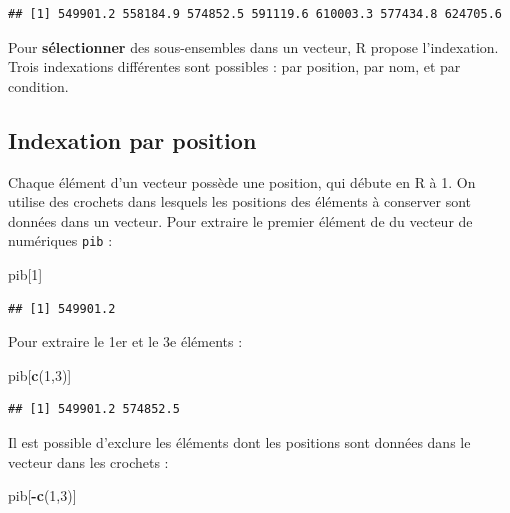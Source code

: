 \documentclass[
  11pt,
]{book}
\newenvironment{Shaded}{\begin{snugshade}}{\end{snugshade}}
\newcommand{\DecValTok}[1]{\textcolor[rgb]{0.00,0.00,0.81}{#1}}
\newcommand{\FunctionTok}[1]{\textcolor[rgb]{0.13,0.29,0.53}{\textbf{#1}}}
\newcommand{\NormalTok}[1]{#1}
\newcommand{\SpecialCharTok}[1]{\textcolor[rgb]{0.81,0.36,0.00}{\textbf{#1}}}
\numberwithin{equation}{section}
\numberwithin{countremarque}{section}
\begin{document}
\begin{lstlisting}
## [1] 549901.2 558184.9 574852.5 591119.6 610003.3 577434.8 624705.6
\end{lstlisting}

Pour \textbf{sélectionner} des sous-ensembles dans un vecteur, R propose l'indexation. Trois indexations différentes sont possibles : par position, par nom, et par condition.

\hypertarget{indexation-par-position}{%
\subsection{Indexation par position}\label{indexation-par-position}}

Chaque élément d'un vecteur possède une position, qui débute en R à 1. On utilise des crochets dans lesquels les positions des éléments à conserver sont données dans un vecteur. Pour extraire le premier élément de du vecteur de numériques \texttt{pib} :

\begin{Shaded}
\begin{Highlighting}[]
\NormalTok{pib[}\DecValTok{1}\NormalTok{]}
\end{Highlighting}
\end{Shaded}

\begin{lstlisting}
## [1] 549901.2
\end{lstlisting}

Pour extraire le 1er et le 3e éléments :

\begin{Shaded}
\begin{Highlighting}[]
\NormalTok{pib[}\FunctionTok{c}\NormalTok{(}\DecValTok{1}\NormalTok{,}\DecValTok{3}\NormalTok{)]}
\end{Highlighting}
\end{Shaded}

\begin{lstlisting}
## [1] 549901.2 574852.5
\end{lstlisting}

Il est possible d'exclure les éléments dont les positions sont données dans le vecteur dans les crochets :

\begin{Shaded}
\begin{Highlighting}[]
\NormalTok{pib[}\SpecialCharTok{{-}}\FunctionTok{c}\NormalTok{(}\DecValTok{1}\NormalTok{,}\DecValTok{3}\NormalTok{)]}
\end{Highlighting}
\end{Shaded}
\end{document}
